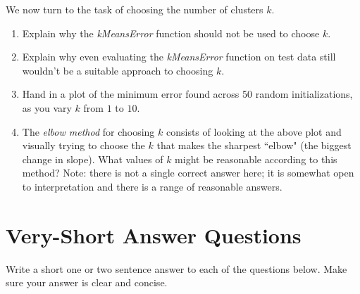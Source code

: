 \documentclass{article}
\def\blu#1{{\color{blu}#1}}
\def\enum#1{\begin{enumerate}#1\end{enumerate}}
\begin{document}
 We now turn to the task of choosing the number of clusters $k$.
  
 \blu{\enum{
 \item Explain why the \emph{kMeansError} function should not be used to choose $k$.
 \item Explain why even evaluating the \emph{kMeansError} function on test data still wouldn't be a suitable approach to choosing $k$.
 \item Hand in a plot of the minimum error found across 50 random initializations, as you vary $k$ from $1$ to $10$.
 \item The \emph{elbow method} for choosing $k$ consists of looking at the above plot and visually trying to choose the $k$ that makes the sharpest ``elbow" (the biggest change in slope). What values of $k$ might be reasonable according to this method? Note: there is not a single correct answer here; it is somewhat open to interpretation and there is a range of reasonable answers.
 }}
 



\section{Very-Short Answer Questions}

\blu{Write a short one or two sentence answer to each of the questions below}. Make sure your answer is clear and concise.
\end{document}
